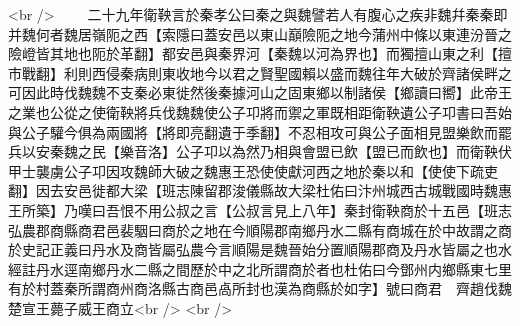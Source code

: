 <br />
　　二十九年衛鞅言於秦孝公曰秦之與魏譬若人有腹心之疾非魏幷秦秦即并魏何者魏居嶺阨之西【索隱曰蓋安邑以東山巔險阨之地今蒲州中條以東連汾晉之險嶝皆其地也阨於革翻】都安邑與秦界河【秦魏以河為界也】而獨擅山東之利【擅市戰翻】利則西侵秦病則東收地今以君之賢聖國賴以盛而魏往年大破於齊諸侯畔之可因此時伐魏魏不支秦必東徙然後秦據河山之固東鄉以制諸侯【鄉讀曰嚮】此帝王之業也公從之使衛鞅將兵伐魏魏使公子卭將而禦之軍既相距衛鞅遺公子卭書曰吾始與公子驩今俱為兩國將【將即亮翻遺于季翻】不忍相攻可與公子面相見盟樂飲而罷兵以安秦魏之民【樂音洛】公子卭以為然乃相與會盟已飲【盟已而飲也】而衛鞅伏甲士襲虜公子卭因攻魏師大破之魏惠王恐使使獻河西之地於秦以和【使使下疏吏翻】因去安邑徙都大梁【班志陳留郡浚儀縣故大梁杜佑曰汴州城西古城戰國時魏惠王所築】乃嘆曰吾恨不用公叔之言【公叔言見上八年】秦封衛鞅商於十五邑【班志弘農郡商縣商君邑裴駰曰商於之地在今順陽郡南鄉丹水二縣有商城在於中故謂之商於史記正義曰丹水及商皆屬弘農今言順陽是魏晉始分置順陽郡商及丹水皆屬之也水經註丹水逕南鄉丹水二縣之間歷於中之北所謂商於者也杜佑曰今鄧州内鄉縣東七里有於村蓋秦所謂商州商洛縣古商邑卨所封也漢為商縣於如字】號曰商君　齊趙伐魏　楚宣王薨子威王商立<br />
<br />
